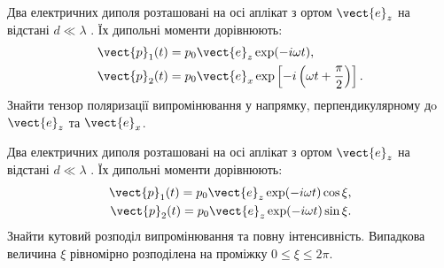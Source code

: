 \begin{problem}
Два електричних диполя розташовані на осі аплікат з ортом $\vect{e}_z$  на відстані $d \ll \lambda$ . Їх дипольні моменти дорівнюють:
\begin{align*}
	\vect{p}_1(t) & = p_0\vect{e}_z\exp(-i\omega t),                                           \\
	\vect{p}_2(t) & = p_0\vect{e}_x\exp\left[ - i\left(\omega t + \frac{\pi}{2}\right)\right].
\end{align*}
Знайти тензор поляризації випромінювання у напрямку, перпендикулярному дo $\vect{e}_z$ та $\vect{e}_x$.
%
\end{problem}


\begin{problem}
Два електричних диполя розташовані на осі аплікат з ортом $\vect{e}_z$  на відстані $d \ll \lambda$ . Їх дипольні моменти дорівнюють:
\begin{align*}
	\vect{p}_1(t) = p_0\vect{e}_z\exp(-i\omega t)\cos\xi, \\
	\vect{p}_2(t) = p_0\vect{e}_z\exp(-i\omega t )\sin\xi.
\end{align*}
Знайти кутовий розподіл випромінювання та повну інтенсивність. Випадкова величина  $\xi$ рівномірно розподілена на проміжку $0 \le \xi \le 2\pi$.
\end{problem}

